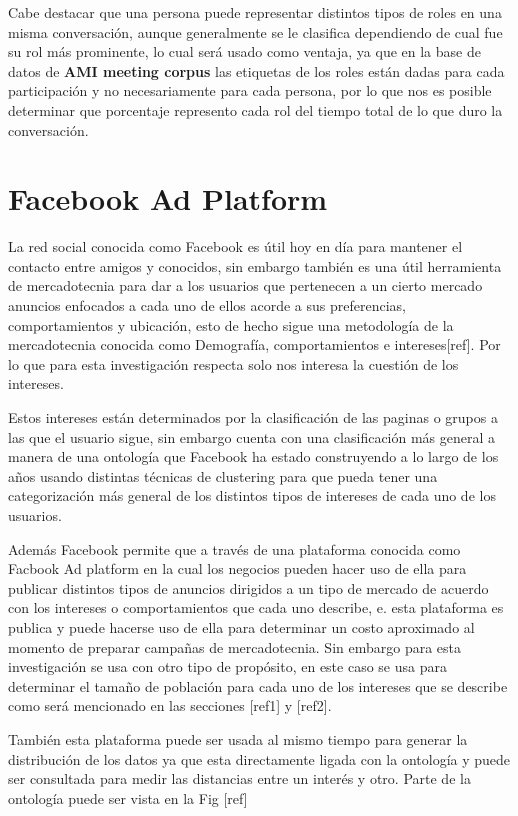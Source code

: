 Cabe destacar que una persona puede representar distintos tipos de roles en una misma conversación, aunque generalmente se le clasifica dependiendo de cual fue su rol más prominente, lo cual será usado como ventaja, ya que en la base de datos de \textbf{AMI meeting corpus} las etiquetas de los roles están dadas para cada participación y no necesariamente para cada persona, por lo que nos es posible determinar que porcentaje represento cada rol del tiempo total de lo que duro la conversación.

\section{Facebook Ad Platform} 
La red social conocida como Facebook es útil hoy en día para mantener el contacto entre amigos y conocidos, sin embargo también es una útil herramienta de mercadotecnia para dar a los usuarios que pertenecen a un cierto mercado anuncios enfocados a cada uno de ellos acorde a sus preferencias, comportamientos y ubicación, esto de hecho sigue una metodología de la mercadotecnia conocida como Demografía, comportamientos e  intereses[ref]. Por lo que para esta investigación respecta solo nos interesa la cuestión de los intereses. 

Estos intereses están determinados por la clasificación de las paginas o grupos a las que el usuario sigue, sin embargo cuenta con una clasificación más general a manera de una ontología que Facebook ha estado construyendo a lo largo de los años usando distintas técnicas de clustering para que pueda tener una categorización más general de los distintos tipos de intereses de cada uno de los usuarios.

Además Facebook permite que a través de una plataforma conocida como Facbook Ad platform en la cual los negocios pueden hacer uso de ella para publicar distintos tipos de anuncios dirigidos a un tipo de mercado de acuerdo con los intereses o comportamientos que cada uno describe, e. esta plataforma es publica y puede hacerse uso de ella para determinar un costo aproximado al momento de preparar campañas de mercadotecnia. Sin embargo para esta investigación se usa con otro tipo de propósito, en este caso se usa para determinar el tamaño de población para cada uno de los intereses que se describe como será mencionado en las secciones [ref1] y [ref2]. 

También esta plataforma puede ser usada al mismo tiempo para generar la distribución de los datos ya que esta directamente ligada con la ontología y puede ser consultada para medir las distancias entre un interés y otro. Parte de la ontología puede ser vista en la Fig [ref]

